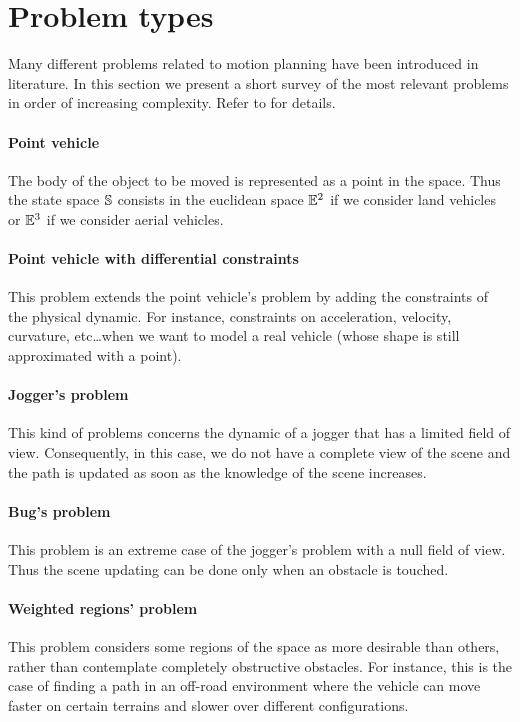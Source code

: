 \documentclass[dissertation.tex]{subfiles}
\begin{document}
\section{Problem types}
Many different problems related to motion
planning have been introduced in literature. In this section we
present a short 
survey of the most relevant problems
in order of increasing complexity. Refer to \cite{goerzen} for
details.

\paragraph{Point vehicle}
The body of the object to be moved is represented as a
point in the space. Thus the state space $\mathbb{S}$ consists in the euclidean
space $\mathbb{E}^2$ if we consider land vehicles or $\mathbb{E}^3$ if we consider
aerial vehicles.

\paragraph{Point vehicle with differential constraints}
This problem extends the point vehicle's problem by adding the
constraints of the physical dynamic. For instance, constraints on
acceleration, velocity, curvature, etc\dots when we want to model a
real vehicle (whose shape is still approximated with a point).

\paragraph{Jogger's problem}
This kind of problems concerns the dynamic of a jogger that has a
limited field of view. Consequently, in this case, we do not have a
complete view of the scene and the path is
updated as soon as the knowledge of the scene increases.

\paragraph{Bug's problem}
This problem is an extreme case of the jogger's problem with a null
field of view. Thus the scene updating can be done only when an
obstacle is touched.

\paragraph{Weighted regions' problem}
This problem considers some regions of the space as more desirable than
others, rather than contemplate completely obstructive obstacles. For
instance, this is the case of finding a path in an off-road 
environment where the vehicle can move faster on certain terrains and
slower over different configurations.
\end{document}
